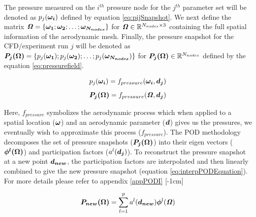 The pressure measured on the \(i^{th}\) pressure node for the \(j^{th}\) parameter set will be denoted as \(p_{j}(\boldsymbol{\omega_{i}})\) defined by equation \ref{eq:pijSnapshot}. We next define the matrix \(\bm{\mathit{\Omega}} = \{\boldsymbol{\omega_{1}}; \boldsymbol{\omega_{2}}; \ldots ; \boldsymbol{\omega_{N_{nodes}}}\}\) for \(\bm{\mathit{\Omega}} \in \mathbb{R}^{N_{nodes} \times 3}\) containing the full spatial information of the aerodynamic mesh. Finally, the pressure snapshot for the CFD/experiment run \(j\) will be denoted as \(\boldsymbol{P_{j}(\Omega)} = \{p_{j}(\boldsymbol{\omega_{1}}); p_{j}(\boldsymbol{\omega_{2}}); \ldots ; p_{j}(\boldsymbol{\omega_{N_{nodes}}})\}\) for \(\boldsymbol{P_{j}(\Omega)} \in \mathbb{R}^{N_{nodes}}\) defined by the equation \ref{eq:pressurefield}.

\begin{equation} \label{eq:pijSnapshot}
p_{j}(\boldsymbol{\omega_{i}}) = f_{pressure}(\boldsymbol{\omega_{i}}, \boldsymbol{d_{j}})
\end{equation} 
\begin{equation}\label{eq:pressurefield}
\boldsymbol{P_{j}(\Omega)} = f_{pressure}(\bm{\mathit{\Omega}}, \boldsymbol{d_{j}})
\end{equation} 

Here, $f_{pressure}$ symbolizes the aerodynamic process which when applied to a spatial location ($\boldsymbol{\omega}$) and an aerodynamic parameter ($\boldsymbol{d}$) gives us the pressures, we eventually wish to approximate this process ($f_{pressure}$). The POD methodology decomposes the set of pressure snapshots ($\boldsymbol{P_{j}(\Omega)}$) into their eigen vectors ($\boldsymbol{\phi^{l}(\Omega)}$) and participation factors ($a^{l}(\boldsymbol{d_{j}})$). To reconstruct the pressure snapshot at a new point $\boldsymbol{d_{new}}$, the participation factors are interpolated and then linearly combined to give the new pressure snapshot (equation \ref{eq:interpPODEquation}). For more details please refer to appendix \ref{appPODI}
[-1cm]

\begin{equation}\label{eq:interpPODEquation}
\boldsymbol{P_{new}(\Omega)} = \sum_{l=1}^{p}a^{l}(\boldsymbol{d_{new}}) \boldsymbol{\phi}^l(\bm{\mathit{\Omega}})
\end{equation}


